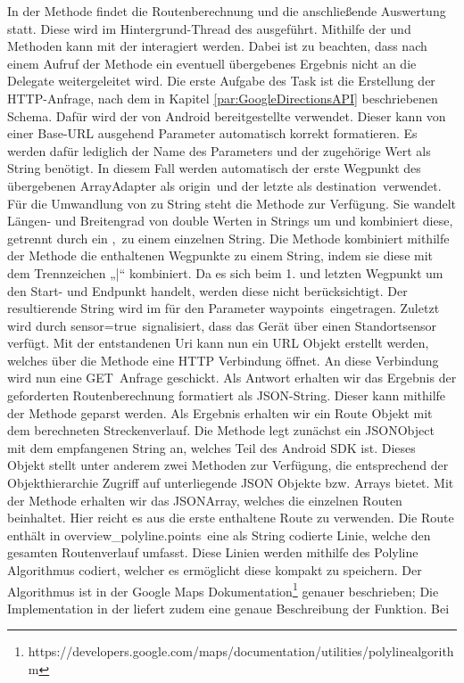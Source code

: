 In der  Methode findet die Routenberechnung und die anschließende Auswertung statt. Diese wird im Hintergrund-Thread des  ausgeführt. Mithilfe der  und  Methoden kann mit der  interagiert werden. Dabei ist zu beachten, dass nach einem Aufruf der  Methode ein eventuell übergebenes Ergebnis nicht an die Delegate weitergeleitet wird. Die erste Aufgabe des Task ist die Erstellung der HTTP-Anfrage, nach dem in Kapitel \ref{par:GoogleDirectionsAPI} beschriebenen Schema. Dafür wird der von Android bereitgestellte  verwendet. Dieser kann von einer Base-URL ausgehend Parameter automatisch korrekt formatieren. Es werden dafür lediglich der Name des Parameters und der zugehörige Wert als String benötigt. In diesem Fall werden automatisch der erste Wegpunkt des übergebenen ArrayAdapter als \glqq origin\grqq\ und der letzte als \glqq destination\grqq\ verwendet. Für die Umwandlung von  zu String steht die  Methode zur Verfügung. Sie wandelt Längen- und Breitengrad von double Werten in Strings um und kombiniert diese, getrennt durch ein \glqq,\grqq\ zu einem einzelnen String. Die  Methode kombiniert mithilfe der  Methode die enthaltenen Wegpunkte zu einem String, indem sie diese mit dem Trennzeichen „|“ kombiniert. Da es sich beim 1. und letzten Wegpunkt um den Start- und Endpunkt handelt, werden diese nicht berücksichtigt. Der resultierende String wird im  für den Parameter \glqq waypoints\grqq\ eingetragen. Zuletzt wird durch \glqq sensor=true\grqq\ signalisiert, dass das Gerät über einen Standortsensor verfügt. Mit der entstandenen Uri kann nun ein URL Objekt erstellt werden, welches über die  Methode eine HTTP Verbindung öffnet. An diese Verbindung wird nun eine \glqq GET\grqq\ Anfrage geschickt. Als Antwort erhalten wir das Ergebnis der geforderten Routenberechnung formatiert als JSON-String. Dieser kann mithilfe der  Methode geparst werden. Als Ergebnis erhalten wir ein Route Objekt mit dem berechneten Streckenverlauf. Die Methode legt zunächst ein JSONObject mit dem empfangenen String an, welches Teil des Android SDK ist. Dieses Objekt stellt unter anderem zwei Methoden zur Verfügung, die entsprechend der Objekthierarchie Zugriff auf unterliegende JSON Objekte bzw. Arrays bietet. Mit der  Methode erhalten wir das JSONArray, welches die einzelnen Routen beinhaltet. Hier reicht es aus die erste enthaltene Route zu verwenden. Die Route enthält in \glqq overview\_polyline.points\grqq\ eine als String codierte Linie, welche den gesamten Routenverlauf umfasst. Diese Linien werden mithilfe des Polyline Algorithmus codiert, welcher es ermöglicht diese kompakt zu speichern. Der Algorithmus ist in der Google Maps Dokumentation\footnote{https://developers.google.com/maps/documentation/utilities/polylinealgorithm} genauer beschrieben; Die Implementation in der  liefert zudem eine genaue Beschreibung der Funktion. Bei 